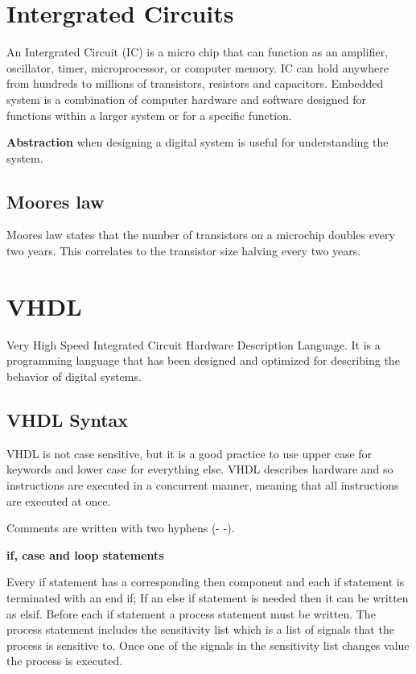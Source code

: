 \section{Intergrated Circuits}

An Intergrated Circuit (IC) is a micro chip that can function as an amplifier, oscillator, timer,
microprocessor, or computer memory.
IC can hold anywhere from hundreds to millions of transistors, resistors and capacitors.
Embedded system is a combination of computer hardware and software designed for functions
within a larger system or for a specific function.


\textbf{Abstraction} when designing a digital system is useful for understanding the system.


\subsection{Moores law}

Moores law states that the number of transistors on a microchip doubles every two years.
This correlates to the transistor size halving every two years.


\section{VHDL}
Very High Speed Integrated Circuit Hardware Description Language.
It is a programming language that has been designed and optimized for describing
the behavior of digital systems.

\subsection{VHDL Syntax}

VHDL is not case sensitive, but it is a good practice to use upper case for keywords and lower case for everything else.
VHDL describes hardware and so instructions are executed in a concurrent manner, meaning that all instructions are executed at once.


Comments are written with two hyphens (- -).


\textbf{if, case and loop statements}

Every if statement has a corresponding then component and each if statement is terminated with an end if;
If an else if statement is needed then it can be written as elsif. Before
each if statement a process statement must be written. The process
statement includes the sensitivity list which is a list of signals that the process is sensitive to.
Once one of the signals in the sensitivity list changes value the process is executed.

